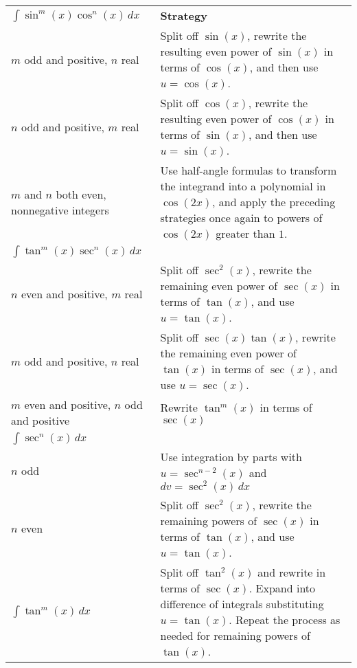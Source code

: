 \documentclass[../mathNotesPreamble]{subfiles}
\begin{document}
  \begin{center}
    \renewcommand{\arraystretch}{1.65}
    \begin{tabularx}{\linewidth}{@{}
      >{\hsize=0.65\hsize}X
      >{\hsize=1.35\hsize}X
      @{}}\toprule
      $\displaystyle \int \sin^m(x)\cos^n(x)\,dx$& \textbf{Strategy}\\
      $m$ odd and positive, $n$ real& 
      Split off $\sin(x)$, rewrite the resulting even power of $\sin(x)$ in terms of $\cos(x)$, and then use $u=\cos(x)$.\\
      $n$ odd and positive, $m$ real& 
      Split off $\cos(x)$, rewrite the resulting even power of $\cos(x)$ in terms of $\sin(x)$, and then use $u=\sin(x)$.\\
      $m$ and $n$ both even, nonnegative integers&
      Use half-angle formulas to transform the integrand into a polynomial in $\cos(2x)$, and apply the preceding strategies once again to powers of $\cos(2x)$ greater than $1$.\\
      \midrule
      $\displaystyle \int \tan^m(x)\sec^n(x)\,dx$\\
      $n$ even and positive, $m$ real& 
      Split off $\sec^2(x)$, rewrite the remaining even power of $\sec(x)$ in terms of $\tan(x)$, and use $u=\tan(x)$.\\
      $m$ odd and positive, $n$ real&
      Split off $\sec(x)\tan(x)$, rewrite the remaining even power of $\tan(x)$ in terms of $\sec(x)$, and use $u=\sec(x)$.\\
      $m$ even and positive, $n$ odd and positive&
      Rewrite $\tan^m(x)$ in terms of $\sec(x)$\\\midrule
      $\displaystyle \int \sec^n(x)\,dx$\\
      $n$ odd&
      Use integration by parts with $u=\sec^{n-2}(x)$ and \newline$dv=\sec^2(x)\,dx$\\
      $n$ even&
      Split off $\sec^2(x)$, rewrite the remaining powers of $\sec(x)$ in terms of $\tan(x)$, and use $u=\tan(x)$.\\\midrule
      $\displaystyle \int \tan^m(x)\,dx$&
      Split off $\tan^2(x)$ and rewrite in terms of $\sec(x)$. Expand into difference of integrals substituting $u=\tan(x)$. Repeat the process as needed for remaining powers of $\tan(x)$.\\
      \bottomrule
    \end{tabularx}
  \end{center}
  \pagebreak
\end{document}
